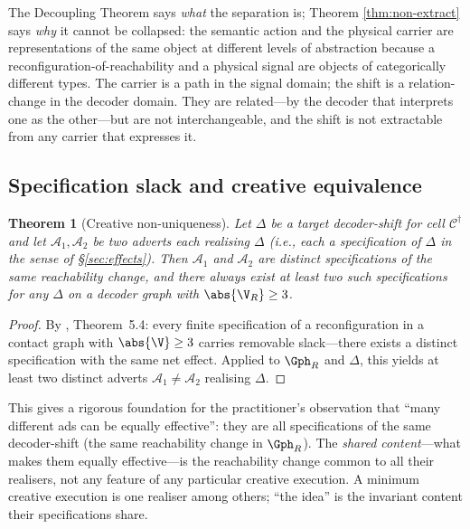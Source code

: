 \documentclass[twocolumn,11pt,a4paper]{article}
\theoremstyle{adv}
\newtheorem{theorem}{Theorem}[section]
\theoremstyle{definition}
\theoremstyle{remark}
\newcommand{\Cell}{\mathcal{C}}        %
\newcommand{\Recv}{R}                  %
\newcommand{\shift}{\Delta}            %
\newcommand{\Adv}{\mathcal{A}}        %
\begin{document}
The Decoupling Theorem says \emph{what} the separation is; Theorem
\ref{thm:non-extract} says \emph{why} it cannot be collapsed: the semantic
action and the physical carrier are representations of the same object at
different levels of abstraction because a reconfiguration-of-reachability and
a physical signal are objects of categorically different types. The carrier is
a path in the signal domain; the shift is a relation-change in the decoder
domain. They are related---by the decoder that interprets one as the
other---but are not interchangeable, and the shift is not extractable from any
carrier that expresses it.

\subsection{Specification slack and creative equivalence}

\begin{theorem}[Creative non-uniqueness]
\label{thm:creative-nonunique}
Let $\shift$ be a target decoder-shift for cell $\Cell^\dagger$ and let
$\Adv_1,\Adv_2$ be two adverts each realising $\shift$ (i.e., each a
specification of $\shift$ in the sense of \S\ref{sec:effects}). Then $\Adv_1$
and $\Adv_2$ are distinct specifications of the same reachability change, and
there always exist at least two such specifications for any $\shift$ on a
decoder graph with $\abs{\V_\Recv}\ge3$.
\end{theorem}

\begin{proof}
By \citet{sachikonye2025knowledge}, Theorem~5.4: every finite specification of
a reconfiguration in a contact graph with $\abs{\V}\ge3$ carries removable
slack---there exists a distinct specification with the same net effect. Applied
to $\Gph_\Recv$ and $\shift$, this yields at least two distinct adverts
$\Adv_1\neq\Adv_2$ realising $\shift$.
\end{proof}

This gives a rigorous foundation for the practitioner's observation that
``many different ads can be equally effective'': they are all specifications of
the same decoder-shift (the same reachability change in $\Gph_\Recv$). The
\emph{shared content}---what makes them equally effective---is the reachability
change common to all their realisers, not any feature of any particular creative
execution. A minimum creative execution is one realiser among others; ``the
idea'' is the invariant content their specifications share.
\end{document}
